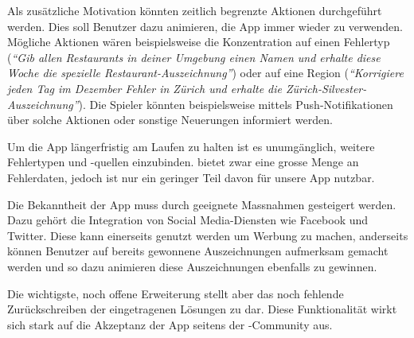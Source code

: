 Als zusätzliche Motivation könnten zeitlich begrenzte Aktionen durchgeführt werden.
Dies soll Benutzer dazu animieren, die App immer wieder zu verwenden. 
Mögliche Aktionen wären beispielsweise die Konzentration auf einen Fehlertyp (\emph{"`Gib allen Restaurants in deiner Umgebung einen Namen und erhalte diese Woche die spezielle Restaurant-Auszeichnung"'}) oder auf eine Region (\emph{"`Korrigiere jeden Tag im Dezember Fehler in Zürich und erhalte die Zürich-Silvester-Auszeichnung"'}).
Die Spieler könnten beispielsweise mittels Push-Notifikationen über solche Aktionen oder sonstige Neuerungen informiert werden.

Um die App längerfristig am Laufen zu halten ist es unumgänglich, weitere Fehlertypen und -quellen einzubinden. 
 bietet zwar eine grosse Menge an Fehlerdaten, jedoch ist nur ein geringer Teil davon für unsere App nutzbar.

Die Bekanntheit der App muss durch geeignete Massnahmen gesteigert werden. Dazu gehört die Integration von Social Media-Diensten wie Facebook und Twitter.
Diese kann einerseits genutzt werden um Werbung zu machen, anderseits können Benutzer auf bereits gewonnene Auszeichnungen aufmerksam gemacht werden und so dazu animieren diese Auszeichnungen ebenfalls zu gewinnen.

Die wichtigste, noch offene Erweiterung stellt aber das noch fehlende Zurückschreiben der eingetragenen Lösungen zu  dar.
Diese Funktionalität wirkt sich stark auf die Akzeptanz der App seitens der -Community aus.